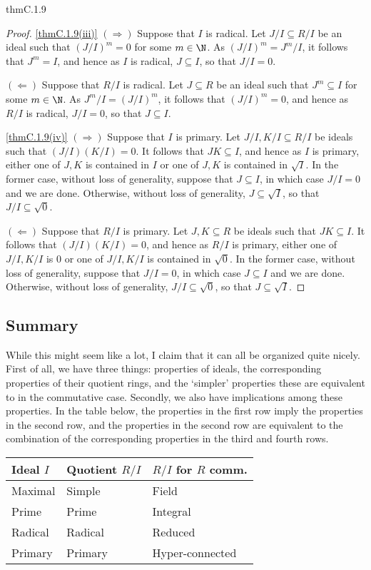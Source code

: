 \begin{thm}{}{thmC.1.9}
\begin{proof}
		\blni
		\cref{thmC.1.9(iii)} $(\Rightarrow )$ Suppose that $I$ is radical.  Let $J/I\subseteq R/I$ be an ideal such that $(J/I)^m=0$ for some $m\in \N$.  As $(J/I)^m=J^m/I$, it follows that $J^m=I$, and hence as $I$ is radical, $J\subseteq I$, so that $J/I=0$.
		
		$(\Leftarrow )$ Suppose that $R/I$ is radical.  Let $J\subseteq R$ be an ideal such that $J^m\subseteq I$ for some $m\in \N$.  As $J^m/I=(J/I)^m$, it follows that $(J/I)^m=0$, and hence as $R/I$ is radical, $J/I=0$, so that $J\subseteq I$.
		
		\blni
		\cref{thmC.1.9(iv)} $(\Rightarrow )$ Suppose that $I$ is primary.  Let $J/I,K/I\subseteq R/I$ be ideals such that $(J/I)(K/I)=0$.  It follows that $JK\subseteq I$, and hence as $I$ is primary, either one of $J,K$ is contained in $I$ or one of $J,K$ is contained in $\sqrt{I}$.  In the former case, without loss of generality, suppose that $J\subseteq I$, in which case $J/I=0$ and we are done.  Otherwise, without loss of generality, $J\subseteq \sqrt{I}$, so that $J/I\subseteq \sqrt{0}$.
		
		$(\Leftarrow )$ Suppose that $R/I$ is primary.  Let $J,K\subseteq R$ be ideals such that $JK\subseteq I$.  It follows that $(J/I)(K/I)=0$, and hence as $R/I$ is primary, either one of $J/I,K/I$ is $0$ or one of $J/I,K/I$ is contained in $\sqrt{0}$.  In the former case, without loss of generality, suppose that $J/I=0$, in which case $J\subseteq I$ and we are done.  Otherwise, without loss of generality, $J/I\subseteq \sqrt{0}$, so that $J\subseteq \sqrt{I}$.
	\end{proof}
\end{thm}

\subsection{Summary}

While this might seem like a lot, I claim that it can all be organized quite nicely.  First of all, we have three things:  properties of ideals, the corresponding properties of their quotient rings, and the `simpler' properties these are equivalent to in the commutative case.   Secondly, we also have implications among these properties.  In the table below, the properties in the first row imply the properties in the second row, and the properties in the second row are equivalent to the combination of the corresponding properties in the third and fourth rows.
\begin{tabu} to \linewidth {X[r]|X[c]|X[l]}
	Ideal $I$ & Quotient $R/I$ & $R/I$ for $R$ comm. \\ \hline
	Maximal & Simple & Field \\
	Prime & Prime & Integral \\
	Radical & Radical & Reduced \\
	Primary & Primary & Hyper-connected
\end{tabu}

